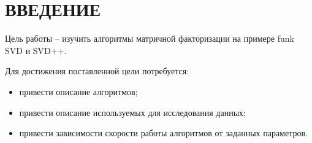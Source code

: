 \section*{ВВЕДЕНИЕ}

Цель работы -- изучить алгоритмы матричной факторизации на примере funk SVD и SVD++.

Для достижения поставленной цели потребуется:
\begin{itemize}
	\item привести описание алгоритмов;
	\item привести описание используемых для исследования данных;
	\item привести зависимости скорости работы алгоритмов от заданных параметров.
\end{itemize}

\pagebreak